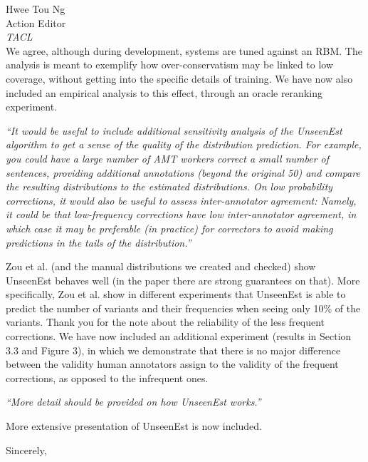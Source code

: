 \documentclass[11pt,letterpaper]{letter}
\newcommand{\oa}[1]{\footnote{\color{red}OA: #1}}
\begin{document}
\begin{letter}{%
Hwee Tou Ng\\
Action Editor\\
{\em TACL}\\
}
We agree, although during development, systems are tuned against an RBM. The analysis is meant to exemplify how over-conservatism may be linked to low coverage, without getting into the specific details of training. We have now also included an empirical analysis to this effect, through an oracle reranking experiment.
	
	\emph{``It would be useful to include additional sensitivity analysis of the
		UnseenEst algorithm to get a sense of the quality of the distribution
		prediction. For example, you could have a large number of AMT workers
		correct a small number of sentences, providing additional annotations
		(beyond the original 50) and compare the resulting distributions to the
		estimated distributions. On low probability corrections, it would also be
		useful to assess inter-annotator agreement: Namely, it could be that
		low-frequency corrections have low inter-annotator agreement, in which case
		it may be preferable (in practice) for correctors to avoid making
		predictions in the tails of the distribution.''
		}
		
Zou et al. (and the manual distributions we created and checked) show UnseenEst behaves well (in the paper there are strong guarantees on that). More specifically, Zou et al. show in different experiments that UnseenEst is able to predict the number of variants and their frequencies when seeing only 10\% of the variants. 
Thank you for the note about the reliability of the less frequent corrections. We have now included an additional experiment (results in Section 3.3 and Figure 3), in which we demonstrate that there is no major difference between the validity human annotators assign to the validity of the frequent corrections, as opposed to the infrequent ones.
		
\emph{``More detail should be provided on how UnseenEst works.''}
		
More extensive presentation of UnseenEst is now included. 


\closing{Sincerely,}

\end{letter}
\end{document}
